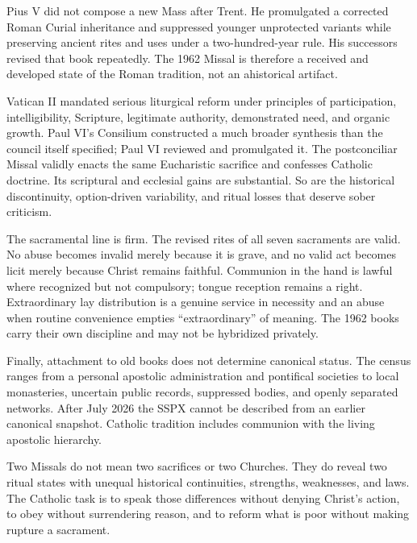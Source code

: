 Pius V did not compose a new Mass after Trent. He promulgated a corrected Roman Curial inheritance and suppressed younger unprotected variants while preserving ancient rites and uses under a two-hundred-year rule. His successors revised that book repeatedly. The 1962 Missal is therefore a received and developed state of the Roman tradition, not an ahistorical artifact.

Vatican II mandated serious liturgical reform under principles of participation, intelligibility, Scripture, legitimate authority, demonstrated need, and organic growth. Paul VI's Consilium constructed a much broader synthesis than the council itself specified; Paul VI reviewed and promulgated it. The postconciliar Missal validly enacts the same Eucharistic sacrifice and confesses Catholic doctrine. Its scriptural and ecclesial gains are substantial. So are the historical discontinuity, option-driven variability, and ritual losses that deserve sober criticism.

The sacramental line is firm. The revised rites of all seven sacraments are valid. No abuse becomes invalid merely because it is grave, and no valid act becomes licit merely because Christ remains faithful. Communion in the hand is lawful where recognized but not compulsory; tongue reception remains a right. Extraordinary lay distribution is a genuine service in necessity and an abuse when routine convenience empties “extraordinary” of meaning. The 1962 books carry their own discipline and may not be hybridized privately.

Finally, attachment to old books does not determine canonical status. The census ranges from a personal apostolic administration and pontifical societies to local monasteries, uncertain public records, suppressed bodies, and openly separated networks. After July 2026 the SSPX cannot be described from an earlier canonical snapshot. Catholic tradition includes communion with the living apostolic hierarchy.

Two Missals do not mean two sacrifices or two Churches. They do reveal two ritual states with unequal historical continuities, strengths, weaknesses, and laws. The Catholic task is to speak those differences without denying Christ's action, to obey without surrendering reason, and to reform what is poor without making rupture a sacrament.

